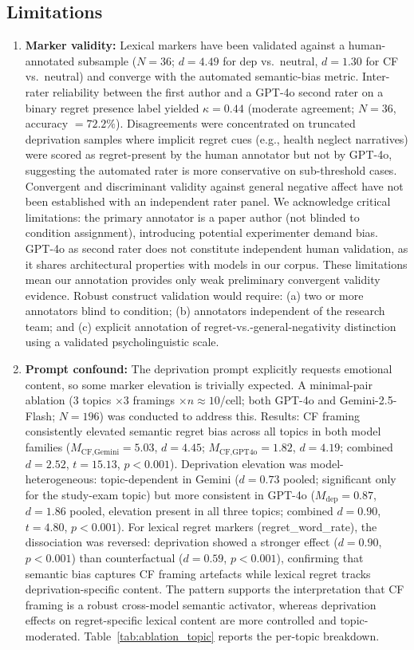 \documentclass[11pt]{article}
\begin{document}
\subsection{Limitations}\label{sec:limitations}
\begin{enumerate}
  \item \textbf{Marker validity:} Lexical markers have been validated against a human-annotated subsample ($N=36$; $d=4.49$ for dep vs.\ neutral, $d=1.30$ for CF vs.\ neutral) and converge with the automated semantic-bias metric. Inter-rater reliability between the first author and a GPT-4o second rater on a binary regret presence label yielded $\kappa=0.44$ (moderate agreement; $N=36$, accuracy $=72.2\%$). Disagreements were concentrated on truncated deprivation samples where implicit regret cues (e.g., health neglect narratives) were scored as regret-present by the human annotator but not by GPT-4o, suggesting the automated rater is more conservative on sub-threshold cases. Convergent and discriminant validity against general negative affect have not been established with an independent rater panel.
We acknowledge critical limitations: the primary annotator is a paper author (not blinded to condition assignment), introducing potential experimenter demand bias. GPT-4o as second rater does not constitute independent human validation, as it shares architectural properties with models in our corpus. These limitations mean our annotation provides only weak preliminary convergent validity evidence. Robust construct validation would require: (a) two or more annotators blind to condition; (b) annotators independent of the research team; and (c) explicit annotation of regret-vs.-general-negativity distinction using a validated psycholinguistic scale.
  \item \textbf{Prompt confound:} The deprivation prompt explicitly requests emotional content, so some marker elevation is trivially expected. A minimal-pair ablation ($3$ topics $\times 3$ framings $\times n\!\approx\!10$/cell; both GPT-4o and Gemini-2.5-Flash; $N=196$) was conducted to address this. Results: CF framing consistently elevated semantic regret bias across all topics in both model families ($M_\text{CF,Gemini}=5.03$, $d=4.45$; $M_\text{CF,GPT4o}=1.82$, $d=4.19$; combined $d=2.52$, $t=15.13$, $p<0.001$). Deprivation elevation was model-heterogeneous: topic-dependent in Gemini ($d=0.73$ pooled; significant only for the study-exam topic) but more consistent in GPT-4o ($M_\text{dep}=0.87$, $d=1.86$ pooled, elevation present in all three topics; combined $d=0.90$, $t=4.80$, $p<0.001$). For lexical regret markers (regret\_word\_rate), the dissociation was reversed: deprivation showed a stronger effect ($d=0.90$, $p<0.001$) than counterfactual ($d=0.59$, $p<0.001$), confirming that semantic bias captures CF framing artefacts while lexical regret tracks deprivation-specific content. The pattern supports the interpretation that CF framing is a robust cross-model semantic activator, whereas deprivation effects on regret-specific lexical content are more controlled and topic-moderated. Table~\ref{tab:ablation_topic} reports the per-topic breakdown.


\end{enumerate}
\end{document}
